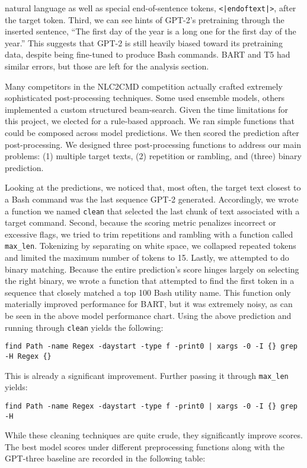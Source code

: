 \documentclass{article}
\begin{document}
natural language as well as special end-of-sentence tokens,
\texttt{<|endoftext|>}, after the target token. Third, we can see hints of
GPT-2's pretraining through the inserted sentence, ``The first day of the year is
a long one for the first day of the year.'' This suggests that GPT-2 is still
heavily biased toward its pretraining data, despite being fine-tuned to produce
Bash commands. BART and T5 had similar errors, but those are left for the
analysis section.
\par
Many competitors in the NLC2CMD competition actually crafted extremely
sophisticated post-processing techniques. Some used ensemble models, others
implemented a custom structured beam-search. Given the time limitations for
this project, we elected for a rule-based approach. We ran simple functions
that could be composed across model predictions. We then scored the
prediction after post-processing. We designed three post-processing functions to
address our main problems: (1) multiple target texts, (2) repetition or
rambling, and (three) binary prediction.
\par
Looking at the predictions, we noticed that, most often, the target text
closest to a Bash command was the last sequence GPT-2 generated. Accordingly, we
wrote a function we named \texttt{clean} that selected the last chunk of text
associated with a target command. Second, because the scoring metric penalizes
incorrect or excessive flags, we tried to trim repetitions and rambling with a
function called \texttt{max\_len}. Tokenizing by separating on white space, we
collapsed repeated tokens and limited the maximum number of tokens to 15.
Lastly, we attempted to do binary matching. Because the entire prediction's
score hinges largely on selecting the right binary, we wrote a function that
attempted to find the first token in a sequence that closely matched a top 100
Bash utility name. This function only materially improved performance for BART,
but it was extremely noisy, as can be seen in the above model performance chart.
Using the above prediction and running through \texttt{clean} yields the
following:
\begin{verbatim}
find Path -name Regex -daystart -type f -print0 | xargs -0 -I {} grep -H Regex {}
\end{verbatim}
This is already a significant improvement. Further passing it through
\texttt{max\_len} yields:
\begin{verbatim}
find Path -name Regex -daystart -type f -print0 | xargs -0 -I {} grep -H
\end{verbatim}
While these cleaning techniques are quite crude, they significantly improve
scores. The best model scores under different preprocessing functions along
with the GPT-three baseline are recorded in the following table:
\end{document}
